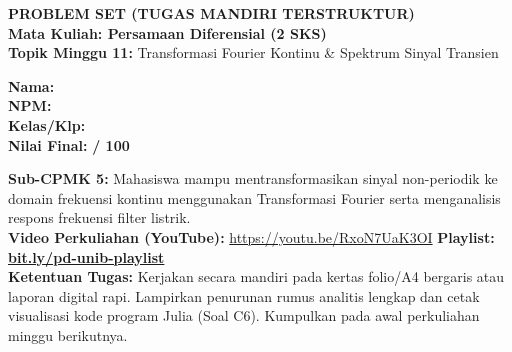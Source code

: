 \documentclass[10pt,a4paper]{article}
\begin{document}
\noindent\begin{minipage}[c]{0.68\textwidth}%
  {\large\textbf{\color{unibblue}PROBLEM SET (TUGAS MANDIRI TERSTRUKTUR)}}\\[1mm]
  {\normalsize\textbf{Mata Kuliah: Persamaan Diferensial (2 SKS)}}\\[0.5mm]
  {\small\textbf{Topik Minggu 11:} Transformasi Fourier Kontinu \& Spektrum Sinyal Transien}%
\end{minipage}%
\hfill%
\begin{minipage}[c]{0.30\textwidth}%
  \begin{tcolorbox}[colback=unibblue!5,colframe=unibblue,boxrule=0.6pt,arc=2pt,left=4pt,right=4pt,top=2pt,bottom=2pt]
    \scriptsize
    \textbf{Nama:} \dotfill\\[1.2mm]
    \textbf{NPM:} \dotfill\\[1.2mm]
    \textbf{Kelas/Klp:} \dotfill\\[1.2mm]
    \textbf{Nilai Final:} \hfill \textbf{/ 100}
  \end{tcolorbox}%
\end{minipage}\par

\vspace{1.5mm}

\begin{tcolorbox}[colback=boxbg,colframe=unibgold!90!black,boxrule=0.6pt,arc=2pt,left=5pt,right=5pt,top=3pt,bottom=3pt,title=\textbf{\scriptsize Capaian Pembelajaran (Sub-CPMK 5) \& Pedoman Pengerjaan Tugas}]
  \scriptsize
  \textbf{Sub-CPMK 5:} Mahasiswa mampu mentransformasikan sinyal non-periodik ke domain frekuensi kontinu menggunakan Transformasi Fourier serta menganalisis respons frekuensi filter listrik.\\
  \textbf{Video Perkuliahan (YouTube):} \url{https://youtu.be/RxoN7UaK3OI} \hfill \textbf{Playlist:} \href{https://www.youtube.com/playlist?list=PLS5oOZWXZeTw}{\color{unibblue}\textbf{bit.ly/pd-unib-playlist}}\\\textbf{Ketentuan Tugas:} Kerjakan secara mandiri pada kertas folio/A4 bergaris atau laporan digital rapi. Lampirkan penurunan rumus analitis lengkap dan cetak visualisasi kode program Julia (Soal C6). Kumpulkan pada awal perkuliahan minggu berikutnya.
\end{tcolorbox}

\vspace{1.5mm}
\end{document}
